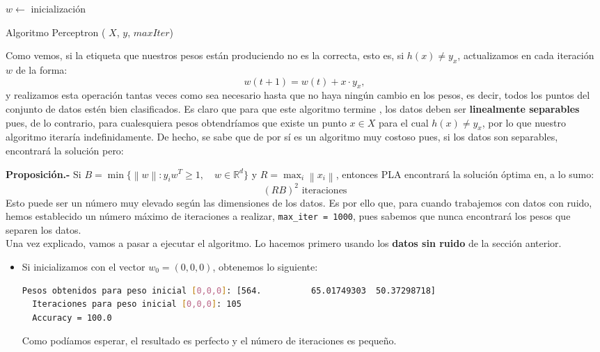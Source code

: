 \documentclass[12pt]{article}
\begin{document}
{\begin{algorithm}[H]
   $w \leftarrow$ inicialización

   \caption{Algoritmo Perceptron ( $X$, $y$, $maxIter$)}
  \end{algorithm}
  
Como vemos, si la etiqueta que nuestros pesos están produciendo no es la correcta, esto es, si $h(x) \neq y_x$,  actualizamos en cada iteración $w$ de la forma:
$$
w(t+1) = w(t) + x \cdot y_x,
$$
y realizamos esta operación tantas veces como sea necesario hasta que no haya ningún cambio en los pesos, es decir, todos los puntos del conjunto de datos estén bien clasificados. Es claro que para que este algoritmo termine , los datos deben ser \textbf{linealmente separables} pues, de lo contrario, para cualesquiera pesos obtendríamos que existe un punto $x \in X$ para el cual $h(x) \neq y_x$, por lo que nuestro algoritmo iteraría indefinidamente. De hecho, se sabe que de por sí es un algoritmo muy costoso pues, si los datos son separables, encontrará la solución pero:

\newcommand{\norm}[1]{\left\lVert#1\right\rVert}

\textbf{Proposición.-} Si $B = \min \{ \norm{w} : y_i w^T \geq 1,\quad w \in \mathbb R^d\}$ y $R = \max_{i} \norm{x_i}$, entonces PLA encontrará la solución óptima en, a lo sumo:
$$
(RB)^2 \text{ iteraciones}
$$
Esto puede ser un número muy elevado según las dimensiones de los datos. Es por ello que, para cuando trabajemos con datos con ruido, hemos establecido un número máximo de iteraciones a realizar, \lstinline{max_iter = 1000}, pues sabemos que nunca encontrará los pesos que separen los datos.\\



Una vez explicado, vamos a pasar a ejecutar el algoritmo. Lo hacemos primero usando los \textbf{datos sin ruido} de la sección anterior.
\begin{itemize}
\item Si inicializamos con el vector $w_0 = (0,0,0)$, obtenemos lo siguiente:
\begin{lstlisting}[language=bash]
  Pesos obtenidos para peso inicial [0,0,0]: [564.          65.01749303  50.37298718]
  Iteraciones para peso inicial [0,0,0]: 105
  Accuracy = 100.0
\end{lstlisting}
Como podíamos esperar, el resultado es perfecto y el número de iteraciones es pequeño.


\end{itemize}}
\end{document}
